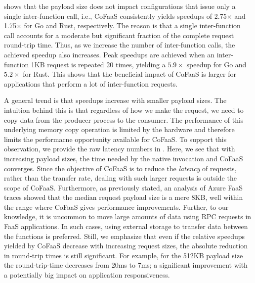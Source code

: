  shows that the payload size does not impact configurations that issue only a single inter-function call, i.e., CoFaaS consistently yields speedups of 2.75$\times$ and 1.75$\times$ for Go and Rust, respectively. The reason is that a single inter-function call accounts for a moderate but significant fraction of the complete request round-trip time. Thus, as we increase the number of inter-function calls, the achieved speedup also increases. Peak speedups are achieved when an inter-function 1KB request is repeated 20 times, yielding a $5.9\times$ speedup for Go and $5.2\times$ for Rust. This shows that the beneficial impact of CoFaaS is larger for applications that perform a lot of inter-function requests.




A general trend is that speedups increase with smaller payload sizes. The intuition behind this is that regardless of how we make the request, we need to copy data from the producer process to the consumer. The performance of this underlying memory copy operation is limited by the hardware and therefore limits the performacne opportunity available for CoFaaS. To support this observation, we provide the raw latency numbers in . Here, we see that with increasing payload sizes, the time needed by the native invocation and CoFaaS converges. Since the objective of CoFaaS is to reduce the \emph{latency} of requests, rather than the transfer rate, dealing with such larger requests is outside the scope of CoFaaS.
Furthermore, as previously stated, an analysis of Azure FaaS traces showed that the median request payload size is a mere 8KB, well within the range where CoFaaS gives performance improvements. Further, to our knowledge, it is uncommon to move large amounts of data using RPC requests in FaaS applications. In such cases, using external storage to transfer data between the functions is preferred. Still, we emphasize that even if the relative speedups yielded by CoFaaS decrease with increasing request sizes, the absolute reduction in round-trip times is still significant. For example, for the 512KB payload size the round-trip-time decreases from 20ms to 7ms; a significant improvement with a potentially big impact on application responsiveness.

